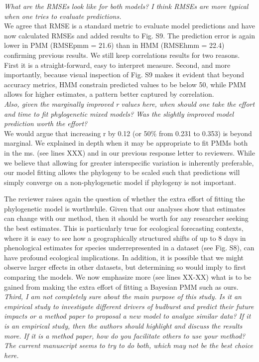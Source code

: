 \documentclass[11pt]{article}
\begin{document}
\emph{What are the RMSEs look like for both models? I think RMSEs are more typical when one tries to evaluate predictions. }\\

We agree that RMSE is a standard metric to evaluate model predictions and have now calculated RMSEs and added results to Fig. S9. The prediction error is again lower in PMM (RMSEpmm = 21.6) than in HMM (RMSEhmm = 22.4) confirming previous results. We still keep correlations results for two reasons. First it is a straight-forward, easy to interpret measure. Second, and more importantly, because visual inspection of Fig. S9 makes it evident that beyond accuracy metrics, HMM constrain predicted values to be below 50, while PMM allows for higher estimates, a pattern better captured by correlation.\\

\emph{Also, given the marginally improved r values here, when should one take the effort and time to fit phylogenetic mixed models? Was the slightly improved model prediction worth the effort?}\\

We would argue that increasing r by 0.12 (or 50\% from 0.231 to 0.353) is beyond marginal. We explained in depth when it may be appropriate to fit PMMs both in the ms. (see lines XXX) and in our previous response letter to reviewers. While we believe that allowing for greater interspecific variation is inherently preferable, our model fitting allows the phylogeny to be scaled such that predictions will simply converge on a non-phylogenetic model if phylogeny is not important. 

The reviewer raises again the question of whether the extra effort of fitting the phylogenetic model is worthwhile. Given that our analyses show that estimates can change with our method, then it should be worth for any researcher seeking the best estimates. This is particularly true for ecological forecasting contexts, where it is easy to see how a geographically structured shifts of up to 8 days in phenological estimates for species underrepresented in a dataset (see Fig. S8), can have profound ecological implications. In addition, it is possible that we might observe larger effects in other datasets, but determining so would imply to first comparing the models. We now emphasize more (see lines XX-XX) what is to be gained from making the extra effort of fitting a Bayesian PMM such as ours.\\

\emph{Third, I am not completely sure about the main purpose of this study. Is it an empirical study to investigate different drivers of budburst and predict their future impacts or a method paper to proposal a new model to analyze similar data? If it is an empirical study, then the authors should highlight and discuss the results more. If it is a method paper, how do you facilitate others to use your method? The current manuscript seems to try to do both, which may not be the best choice here.}\\
\end{document}

